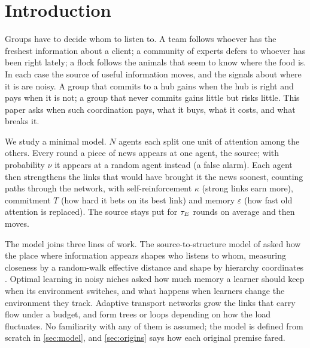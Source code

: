 \section{Introduction}\label{sec:intro}

Groups have to decide whom to listen to. A team follows whoever has the freshest information about a client; a
community of experts defers to whoever has been right lately; a flock follows the animals that seem to know where the
food is. In each case the source of useful information moves, and the signals about where it is are noisy. A group that
commits to a hub gains when the hub is right and pays when it is not; a group that never commits gains little but risks
little. This paper asks when such coordination pays, what it buys, what it costs, and what breaks it.

We study a minimal model. $N$ agents each split one unit of attention among the others. Every round a piece of news
appears at one agent, the source; with probability $\nu$ it appears at a random agent instead (a false alarm). Each agent
then strengthens the links that would have brought it the news soonest, counting paths through the network, with
self-reinforcement $\kappa$ (strong links earn more), commitment $T$ (how hard it bets on its best link) and memory
$\varepsilon$ (how fast old attention is replaced). The source stays put for $\tau_E$ rounds on average and then moves.

The model joins three lines of work. The source-to-structure model of \citet{bromberg2020hierarchy} asked how the place
where information appears shapes who listens to whom, measuring closeness by a random-walk effective distance
\citep{brockmann2013hidden} and shape by hierarchy coordinates \citep{corominas2013originsheirarchy}. Optimal learning
in noisy niches \citep{lee2024constructing} asked how much memory a learner should keep when its environment switches,
and what happens when learners change the environment they track. Adaptive transport networks
\citep{corson2010fluctuations,katifori2010damage,ronellenfitsch2016global} grow the links that carry flow under a
budget, and form trees or loops depending on how the load fluctuates. No familiarity with any of them is assumed; the
model is defined from scratch in \cref{sec:model}, and \cref{sec:origins} says how each original premise fared.

